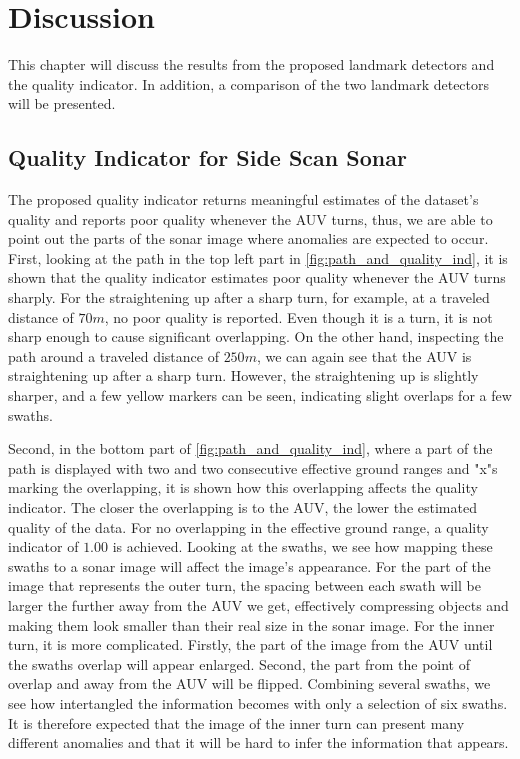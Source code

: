 \chapter{Discussion}

This chapter will discuss the results from the proposed landmark detectors and the quality indicator. In addition, a comparison of the two landmark detectors will be presented. 

\section{Quality Indicator for Side Scan Sonar}

The proposed quality indicator returns meaningful estimates of the dataset's quality and reports poor quality whenever the AUV turns, thus, we are able to point out the parts of the sonar image where anomalies are expected to occur. First, looking at the path in the top left part in \cref{fig:path_and_quality_ind}, it is shown that the quality indicator estimates poor quality whenever the AUV turns sharply. For the straightening up after a sharp turn, for example, at a traveled distance of $70 m$, no poor quality is reported. Even though it is a turn, it is not sharp enough to cause significant overlapping. On the other hand, inspecting the path around a traveled distance of $250 m$, we can again see that the AUV is straightening up after a sharp turn. However, the straightening up is slightly sharper, and a few yellow markers can be seen, indicating slight overlaps for a few swaths. 

Second, in the bottom part of \cref{fig:path_and_quality_ind}, where a part of the path is displayed with two and two consecutive effective ground ranges and "x"s marking the overlapping, it is shown how this overlapping affects the quality indicator. The closer the overlapping is to the AUV, the lower the estimated quality of the data. For no overlapping in the effective ground range, a quality indicator of $1.00$ is achieved. Looking at the swaths, we see how mapping these swaths to a sonar image will affect the image's appearance. For the part of the image that represents the outer turn, the spacing between each swath will be larger the further away from the AUV we get, effectively compressing objects and making them look smaller than their real size in the sonar image. For the inner turn, it is more complicated. Firstly, the part of the image from the AUV until the swaths overlap will appear enlarged. Second, the part from the point of overlap and away from the AUV will be flipped. Combining several swaths, we see how intertangled the information becomes with only a selection of six swaths. It is therefore expected that the image of the inner turn can present many different anomalies and that it will be hard to infer the information that appears. 


